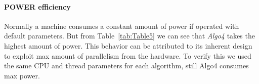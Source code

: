 \paragraph{POWER efficiency}
Normally a machine consumes a constant amount of power if operated
with default parameters. But from Table~\ref{tab:Table5} we can see
that \emph{Algo4} takes the highest amount of power. This behavior can
be attributed to its inherent design to exploit max amount of
parallelism from the hardware.  To verify this we used the same
CPU and thread parameters for each algorithm, still Algo4 consumes max
power.

























